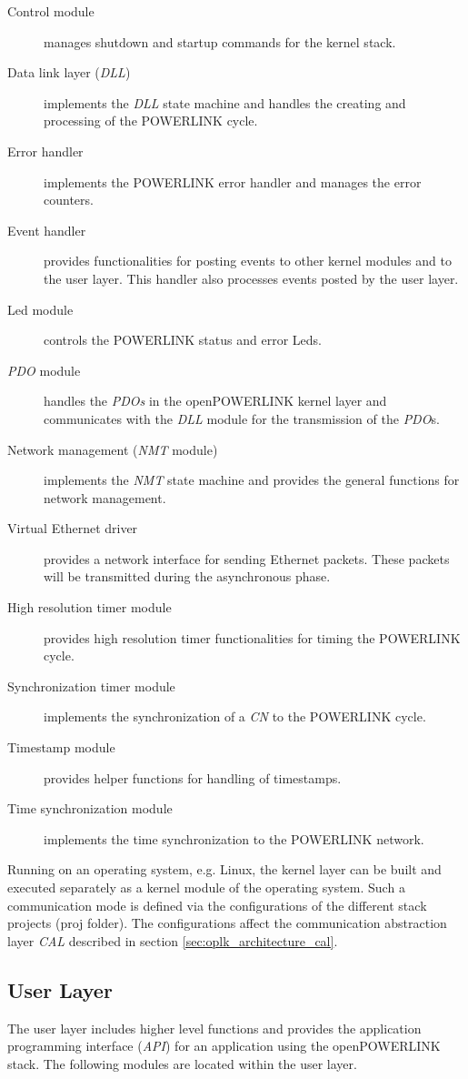 \begin{description}
    \item[Control module] manages shutdown and startup commands for the kernel stack.
    \item[Data link layer (\emph{DLL})] implements the \emph{DLL} state machine and handles the creating and processing of the POWERLINK cycle.
    \item[Error handler] implements the POWERLINK error handler and manages the error counters.
    \item[Event handler] provides functionalities for posting events to other kernel modules and to the user layer.
    This handler also processes events posted by the user layer.
    \item[Led module] controls the POWERLINK status and error Leds.
    \item[\emph{PDO} module] handles the \emph{PDOs} in the openPOWERLINK kernel layer and communicates with the \emph{DLL} module for the transmission of the \emph{PDO}s.
    \item[Network management (\emph{NMT} module)] implements the \emph{NMT} state machine and provides the general functions for network management.
    \item[Virtual Ethernet driver] provides a network interface for sending Ethernet packets.
    These packets will be transmitted during the asynchronous phase.
    \item[High resolution timer module] provides high resolution timer functionalities for timing the POWERLINK cycle.
    \item[Synchronization timer module] implements the synchronization of a \emph{CN} to the POWERLINK cycle.
    \item[Timestamp module] provides helper functions for handling of timestamps.
    \item[Time synchronization module] implements the time synchronization to the POWERLINK network.
\end{description}

Running on an operating system, e.g. Linux, the kernel layer can be built and executed separately as a kernel module of the operating system.
Such a communication mode is defined via the configurations of the different stack projects (proj folder).
The configurations affect the communication abstraction layer \emph{CAL} described in section \ref{sec:oplk_architecture_cal}.

\subsection{User Layer}
\label{sec:oplk_architecture_user}
\begin{sloppypar}
The user layer includes higher level functions and provides the application programming interface (\emph{API}) for an application using the openPOWERLINK stack.
The following modules are located within the user layer. \cite[openPOWERLINK User Layer]{openpowerlink_doc}
\end{sloppypar}

